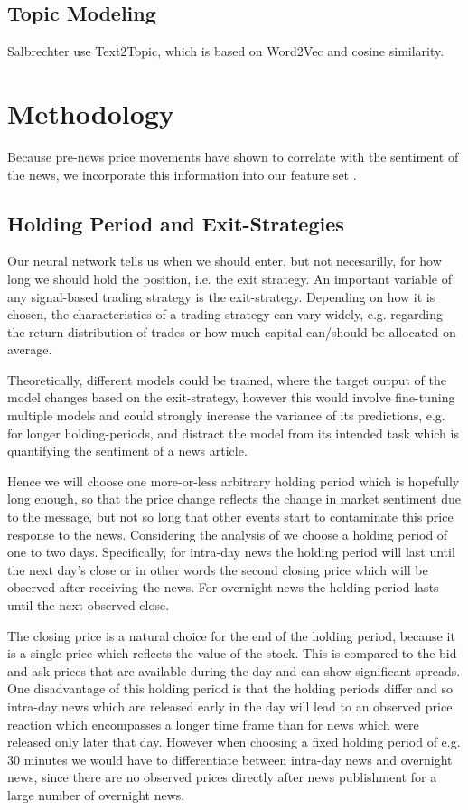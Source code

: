 \documentclass[12pt,a4paper]{article}
\begin{document}
	\subsection{Topic Modeling}
	Salbrechter use Text2Topic, which is based on Word2Vec and cosine similarity.
	
	
	
	
	\section{Methodology}
	Because pre-news price movements have shown to correlate with the sentiment of the news, we incorporate this information
	into our feature set \cite{ke_predicting_2020}.
	
	\subsection{Holding Period and Exit-Strategies}
	Our neural network tells us when we should enter, but not necesarilly, for how long we should hold the position, i.e. the exit strategy.
	An important variable of any signal-based trading strategy is the exit-strategy.
	Depending on how it is chosen, the characteristics of a trading strategy can vary widely, e.g. regarding the return distribution of trades or how much capital can/should be allocated on average.
	
	Theoretically, different models could be trained, where the target output of the model changes based on the exit-strategy, 
	however this would involve fine-tuning multiple models and could strongly increase the variance of its predictions, e.g. for longer holding-periods, 
	and distract the model from its intended task which is quantifying the sentiment of a news article.
	
	Hence we will choose one more-or-less arbitrary holding period which is hopefully long enough, so that the price change
	reflects the change in market sentiment due to the message, but not so long that other events start to contaminate this price response to the news.
	Considering the analysis of \cite{ke_predicting_2020} we choose a holding period of one to two days.
	Specifically, for intra-day news the holding period will last until the next day's close or in other words
	the second closing price which will be observed after receiving the news.
	For overnight news the holding period lasts until the next observed close.
	
	The closing price is a natural choice for the end of the holding period, because it is a single price which reflects the value of the stock. 
	This is compared to the bid and ask prices that are available during the day and can show significant spreads.
	One disadvantage of this holding period is that the holding periods differ and so intra-day news which are released
	early in the day will lead to an observed price reaction which encompasses a longer time frame than for news which were released only later that day.
	However when choosing a fixed holding period of e.g. 30 minutes we would have to differentiate between intra-day news and overnight news, since there are no observed prices directly after news publishment for a large number of overnight news.
	
\end{document}
